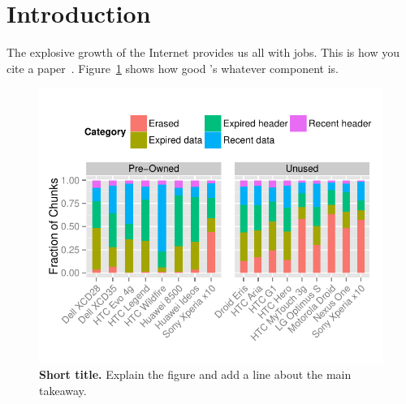 \section{Introduction}
\label{sec:intro}

The explosive growth of the Internet provides us all with jobs. This is how you
cite a paper~\cite{Walls:2011a}. Figure~\ref{fig:bar} shows how good \sysname's
whatever component is.

\Blindtext[3]

\begin{figure}[t]
\centering
\includegraphics[width=\columnwidth]{../figures/bar_chunk/bar_chunk_fraction.pdf}
\caption{\textbf{Short title.} Explain the figure and add a line about the main takeaway.}
\label{fig:bar}
\end{figure} 


